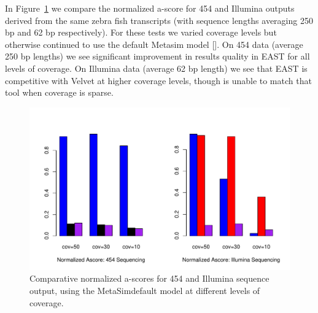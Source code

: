 \documentclass{bioinfo}
\newcommand{\metasim} {{\small MetaSim}}
\newcommand{\east} {{\small EAST}}
\newcommand{\velvet}{{\small Velvet}}
\begin{document}
\vspace{3mm}

 In
Figure~\ref{nextgenAscore} we compare the normalized a-score for 454
and Illumina outputs derived from the same zebra fish transcripts
(with sequence lengths averaging 250 bp and 62 bp respectively).  For
these tests we varied coverage levels but otherwise continued to use
the default Metasim model [\cite{Richter08}].  On 454 data (average
250 bp lengths) we see significant improvement in results quality in
\east\/ for all levels of coverage.  On Illumina data (average 62 bp
length) we see that \east\/ is competitive with \velvet\/ at higher
coverage levels, though is unable to match that tool when coverage is
sparse.

\begin{figure}[htb]
\centerline{\includegraphics[width=5in]{pics.d/ascore_nxtgen.pdf}}
\caption{Comparative normalized a-scores for 454 and Illumina sequence
  output, using the \metasim default model at different levels
  of coverage.}
\label{nextgenAscore}
\end{figure}

\vspace{3mm}
\end{document}
